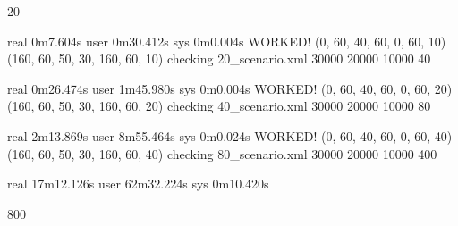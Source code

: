 20

real	0m7.604s
user	0m30.412s
sys	0m0.004s
WORKED! (0, 60, 40, 60, 0, 60, 10) (160, 60, 50, 30, 160, 60, 10) checking 20_scenario.xml 30000 20000 10000
40

real	0m26.474s
user	1m45.980s
sys	0m0.004s
WORKED! (0, 60, 40, 60, 0, 60, 20) (160, 60, 50, 30, 160, 60, 20) checking 40_scenario.xml 30000 20000 10000
80

real	2m13.869s
user	8m55.464s
sys	0m0.024s
WORKED! (0, 60, 40, 60, 0, 60, 40) (160, 60, 50, 30, 160, 60, 40) checking 80_scenario.xml 30000 20000 10000
400

real	17m12.126s
user	62m32.224s
sys	0m10.420s

800

